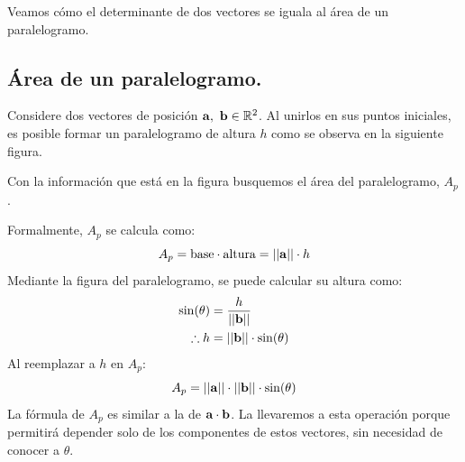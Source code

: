 \documentclass[12pt]{article}
\begin{document}
Veamos cómo el determinante de dos vectores se iguala al área de un paralelogramo.

\subsection{Área de un paralelogramo.}

Considere dos vectores de posición $\mathbf{a}, \ \mathbf{b} \in \mathbb{R}^{2}$. Al unirlos en sus puntos iniciales, es posible formar un paralelogramo de altura $h$ como se observa en la siguiente figura.

\begin{figure}[hbt!]
\centering


\end{figure}

Con la información que está en la figura busquemos el área del paralelogramo, $A_{p}$.

Formalmente, $A_{p}$ se calcula como:
\[
  A_{p} = \text{base} \cdot \text{altura} = ||\mathbf{a}|| \cdot h
\]
Mediante la figura del paralelogramo, se puede calcular su altura como:
\begin{align*}
  \sin(\theta) &= \frac{h}{||\mathbf{b}||} \\
  \therefore h &= ||\mathbf{b}|| \cdot \sin(\theta)
\end{align*}
Al reemplazar a $h$ en $A_{p}$:
\[
  A_{p} = ||\mathbf{a}|| \cdot ||\mathbf{b}|| \cdot \sin(\theta)
\]
La fórmula de $A_{p}$ es similar a la de $\mathbf{a} \cdot \mathbf{b}$. La llevaremos a esta operación porque permitirá depender solo de los componentes de estos vectores, sin necesidad de conocer a $\theta$.
\end{document}

